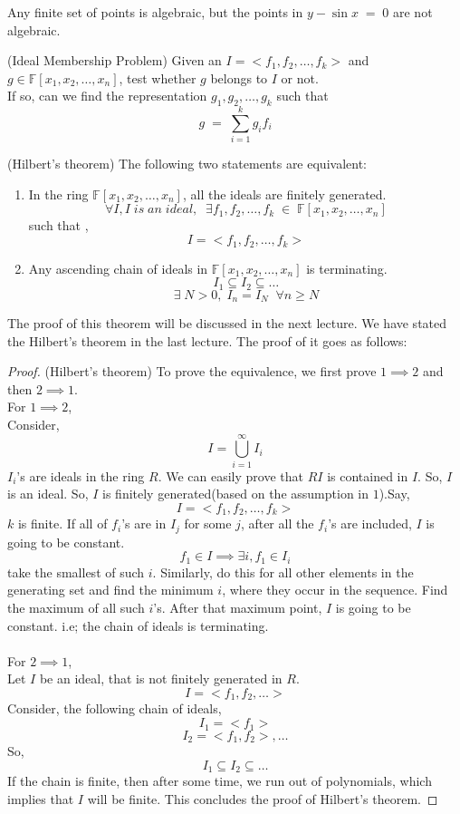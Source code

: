 Any finite set of points is algebraic, but the points in $y-\sin x\;=\;0$ are not algebraic.\\
\begin{definition}(Ideal Membership Problem)
Given an $I = <f_1,f_2, \ldots, f_k>$ and $g \in \mathbb{F}[x_1,x_2,\ldots,x_n]$, test whether $g$ belongs to $I$ or not.\\
If so, can we find the representation $g_1,g_2,\ldots,g_k$ such that $$
	g\;=\;\sum_{i=1}^k g_if_i
$$
\end{definition}
\begin{theorem}(Hilbert's theorem)
The following two statements are equivalent:
\begin{enumerate}
\item In the ring $\mathbb{F}[x_1,x_2,\ldots,x_n]$, all the ideals are finitely generated.\\
$$\forall I, I\;is\;an\;ideal,\;\;\exists f_1,f_2,\ldots,f_k\;\in\;\mathbb{F}[x_1,x_2,\ldots,x_n]$$ 
such that ,$$I = <f_1,f_2,\ldots,f_k>$$
\item Any ascending chain of ideals in $\mathbb{F}[x_1,x_2,\ldots,x_n]$ is terminating.
$$
	I_1 \subseteq I_2\subseteq\ldots
$$
$$
\exists\; N > 0 ,\; I_n = I_N\;\; \forall n \geq N
$$
\end{enumerate}
\end{theorem}
The proof of this theorem will be discussed in the next lecture.
We have stated the Hilbert's theorem in the last lecture. The proof of it goes as follows:
\begin{proof}(Hilbert's theorem)
To prove the equivalence, we first prove $1 \implies 2$ and then $2 \implies 1$.\\
For $1 \implies 2$,\\
Consider, $$ I = \bigcup_{i=1}^{\infty}I_i$$
$I_i$'s are ideals in the ring $R$. We can easily prove that $RI$ is contained in $I$. So, $I$ is an ideal. So, $I$ is finitely generated(based on the assumption in $1$).Say, 
$$
	I = <f_1,f_2,\ldots,f_k>
$$
$k$ is finite. If all of $f_i$'s are in $I_j$ for some $j$, after all the $f_i$'s are included, $I$ is going to be constant.
$$
f_1 \in I \implies \exists i, f_1\in I_i
$$
take the smallest of such $i$. Similarly, do this for all other elements in the generating set and find the minimum $i$, where they occur in the sequence. Find the maximum of all such $i$'s. After that maximum point, $I$ is going to be constant. i.e; the chain of ideals is terminating.\\\\
For $2 \implies 1$,\\
Let $I$ be an ideal, that is not finitely generated in $R$.\\
$$
I = <f_1,f_2,\ldots>
$$
Consider, the following chain of ideals, 
$$I_1=<f_1>$$
$$I_2=<f_1,f_2>,\ldots$$
So,
$$
I_1\subseteq I_2\subseteq \ldots
$$
If the chain is finite, then after some time, we run out of polynomials, which implies that $I$ will be finite. 
This concludes the proof of Hilbert's theorem.
\end{proof}
